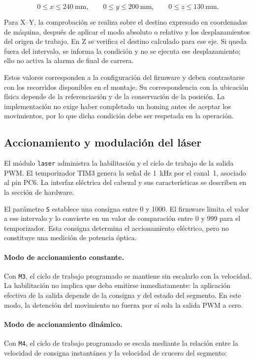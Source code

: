 \documentclass[blue,fullpaper]{ludusofficial}  %
\begin{document}
\begin{equation}
    0 \leq x \leq 240~\mathrm{mm},\qquad
    0 \leq y \leq 200~\mathrm{mm},\qquad
    0 \leq z \leq 130~\mathrm{mm}.
\end{equation}

Para X--Y, la comprobación se realiza sobre el destino
expresado en coordenadas de máquina, después de aplicar
el modo absoluto o relativo y los desplazamientos
del origen de trabajo. En Z se verifica el destino
calculado para ese eje. Si queda fuera del intervalo,
se informa la condición y no se ejecuta ese desplazamiento;
ello no activa la alarma de final de carrera.

Estos valores corresponden a la configuración del
firmware y deben contrastarse con los recorridos
disponibles en el montaje. Su correspondencia con
la ubicación física depende de la referenciación
y de la conservación de la posición. La implementación
no exige haber completado un homing antes de aceptar
los movimientos, por lo que dicha condición debe
ser respetada en la operación.

\subsection{Accionamiento y modulación del láser}

El módulo \texttt{laser} administra la habilitación
y el ciclo de trabajo de la salida PWM. El temporizador
TIM3 genera la señal de 1~kHz por el canal~1, asociado
al pin PC6. La interfaz eléctrica del cabezal y sus
características se describen en la sección de hardware.

El parámetro \texttt{S} establece una consigna entre
0 y 1000. El firmware limita el valor a ese intervalo
y lo convierte en un valor de comparación entre
0 y 999 para el temporizador. Esta consigna determina
el accionamiento eléctrico, pero no constituye una
medición de potencia óptica.

\paragraph{Modo de accionamiento constante.}
Con \texttt{M3}, el ciclo de trabajo programado
se mantiene sin escalarlo con la velocidad.
La habilitación no implica que deba emitirse
inmediatamente: la aplicación efectiva de la salida
depende de la consigna y del estado del segmento.
En este modo, la detención del movimiento no fuerza
por sí sola la salida PWM a cero.

\paragraph{Modo de accionamiento dinámico.}
Con \texttt{M4}, el ciclo de trabajo programado
se escala mediante la relación entre la velocidad
de consigna instantánea y la velocidad de crucero
del segmento:
\end{document}
